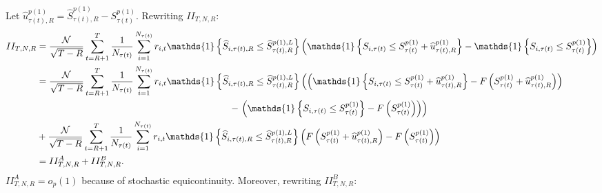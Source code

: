 Let $\widehat{u}_{\tau(t),R}^{p(1)}=\widehat{S}_{\tau(t),R}^{p(1)}-S_{\tau(t)}^{p(1)}$. Rewriting $II_{T,N,R}$:
\begin{align*}
    II_{T,N,R} &=\frac{\mathcal{N}}{\sqrt{T-R}}\sum_{t=R+1}^{T}\frac{1}{N_{\tau(t)}}\sum_{i=1}^{N_{\tau(t)}}r_{i,t} \mathds{1} \left\{ \widehat{S}_{i,\tau(t),R}\leq \widehat{S}_{\tau(t),R}^{p(1),L}\right\} \left( \mathds{1} \left\{ S_{i,\tau(t)}\leq S_{\tau(t)}^{p(1)}+\widehat{u}_{\tau(t),R}^{p(1)}\right\} -\mathds{1} \left\{ S_{i,\tau(t)}\leq S_{\tau(t)}^{p(1)}\right\} \right) \\
    &=\frac{\mathcal{N}}{\sqrt{T-R}}\sum_{t=R+1}^{T}\frac{1}{N_{\tau(t)}}\sum_{i=1}^{N_{\tau(t)}}r_{i,t}\mathds{1} \left\{ \widehat{S}_{i,\tau(t),R}\leq \widehat{S}_{\tau(t),R}^{p(1),L}\right\} \left( \left( \mathds{1} \left\{ S_{i,\tau(t)}\leq S_{\tau(t)}^{p(1)}+\widehat{u}_{\tau(t),R}^{p(1)}\right\} -F\left( S_{\tau(t)}^{p(1)}+\widehat{u}_{\tau(t),R}^{p(1)}\right) \right) \right. \\
    &\hspace{7.3cm}- \left. \left( \mathds{1} \left\{ S_{i,\tau(t)}\leq S_{\tau(t)}^{p(1)}\right\} -F\left(S_{\tau(t)}^{p(1)}\right)\right) \right) \\
    &+\frac{\mathcal{N}}{\sqrt{T-R}}\sum_{t=R+1}^{T}\frac{1}{N_{\tau(t)}}\sum_{i=1}^{N_{\tau(t)}}r_{i,t}\mathds{1} \left\{ \widehat{S}_{i,\tau(t),R}\leq \widehat{S}_{\tau(t),R}^{p(1),L}\right\} \left( F\left( S_{\tau(t)}^{p(1)}+\widehat{u}_{\tau(t),R}^{p(1)}\right) -F\left( S_{\tau(t)}^{p(1)}\right) \right) \\
    &= II_{T,N,R}^A + II_{T,N,R}^B.
\end{align*}
$II_{T,N,R}^A = o_p(1)$ because of stochastic equicontinuity. Moreover, rewriting $II_{T,N,R}^B$:
